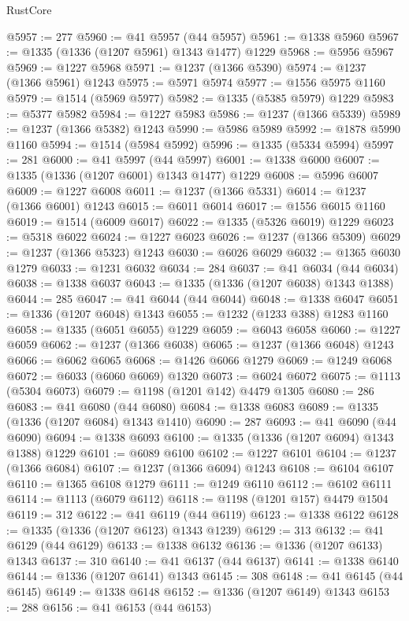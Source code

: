 \begin{lexlean}{RustCore}
\begin{coremodule}
@5957 := 277
@5960 := @41 @5957 (@44 @5957)
@5961 := @1338 @5960
@5967 := @1335 (@1336 (@1207 @5961) @1343 @1477) @1229
@5968 := @5956 @5967
@5969 := @1227 @5968
@5971 := @1237 (@1366 @5390)
@5974 := @1237 (@1366 @5961) @1243
@5975 := @5971 @5974
@5977 := @1556 @5975 @1160
@5979 := @1514 (@5969 @5977)
@5982 := @1335 (@5385 @5979) @1229
@5983 := @5377 @5982
@5984 := @1227 @5983
@5986 := @1237 (@1366 @5339)
@5989 := @1237 (@1366 @5382) @1243
@5990 := @5986 @5989
@5992 := @1878 @5990 @1160
@5994 := @1514 (@5984 @5992)
@5996 := @1335 (@5334 @5994)
@5997 := 281
@6000 := @41 @5997 (@44 @5997)
@6001 := @1338 @6000
@6007 := @1335 (@1336 (@1207 @6001) @1343 @1477) @1229
@6008 := @5996 @6007
@6009 := @1227 @6008
@6011 := @1237 (@1366 @5331)
@6014 := @1237 (@1366 @6001) @1243
@6015 := @6011 @6014
@6017 := @1556 @6015 @1160
@6019 := @1514 (@6009 @6017)
@6022 := @1335 (@5326 @6019) @1229
@6023 := @5318 @6022
@6024 := @1227 @6023
@6026 := @1237 (@1366 @5309)
@6029 := @1237 (@1366 @5323) @1243
@6030 := @6026 @6029
@6032 := @1365 @6030 @1279
@6033 := @1231 @6032
@6034 := 284
@6037 := @41 @6034 (@44 @6034)
@6038 := @1338 @6037
@6043 := @1335 (@1336 (@1207 @6038) @1343 @1388)
@6044 := 285
@6047 := @41 @6044 (@44 @6044)
@6048 := @1338 @6047
@6051 := @1336 (@1207 @6048) @1343
@6055 := @1232 (@1233 @388) @1283 @1160
@6058 := @1335 (@6051 @6055) @1229
@6059 := @6043 @6058
@6060 := @1227 @6059
@6062 := @1237 (@1366 @6038)
@6065 := @1237 (@1366 @6048) @1243
@6066 := @6062 @6065
@6068 := @1426 @6066 @1279
@6069 := @1249 @6068
@6072 := @6033 (@6060 @6069) @1320
@6073 := @6024 @6072
@6075 := @1113 (@5304 @6073)
@6079 := @1198 (@1201 @142) @4479 @1305
@6080 := 286
@6083 := @41 @6080 (@44 @6080)
@6084 := @1338 @6083
@6089 := @1335 (@1336 (@1207 @6084) @1343 @1410)
@6090 := 287
@6093 := @41 @6090 (@44 @6090)
@6094 := @1338 @6093
@6100 := @1335 (@1336 (@1207 @6094) @1343 @1388) @1229
@6101 := @6089 @6100
@6102 := @1227 @6101
@6104 := @1237 (@1366 @6084)
@6107 := @1237 (@1366 @6094) @1243
@6108 := @6104 @6107
@6110 := @1365 @6108 @1279
@6111 := @1249 @6110
@6112 := @6102 @6111
@6114 := @1113 (@6079 @6112)
@6118 := @1198 (@1201 @157) @4479 @1504
@6119 := 312
@6122 := @41 @6119 (@44 @6119)
@6123 := @1338 @6122
@6128 := @1335 (@1336 (@1207 @6123) @1343 @1239)
@6129 := 313
@6132 := @41 @6129 (@44 @6129)
@6133 := @1338 @6132
@6136 := @1336 (@1207 @6133) @1343
@6137 := 310
@6140 := @41 @6137 (@44 @6137)
@6141 := @1338 @6140
@6144 := @1336 (@1207 @6141) @1343
@6145 := 308
@6148 := @41 @6145 (@44 @6145)
@6149 := @1338 @6148
@6152 := @1336 (@1207 @6149) @1343
@6153 := 288
@6156 := @41 @6153 (@44 @6153)

\end{coremodule}
\end{lexlean}
